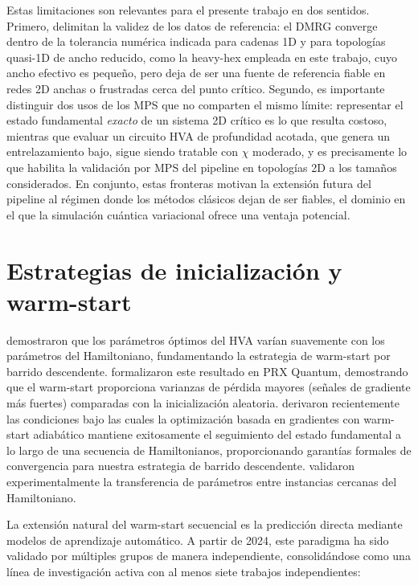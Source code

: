 \documentclass[11pt,a4paper,spanish]{book}
\begin{document}
Estas limitaciones son relevantes para el presente trabajo en dos sentidos. Primero, delimitan la validez de los datos de referencia: el DMRG converge dentro de la tolerancia numérica indicada para cadenas 1D y para topologías quasi-1D de ancho reducido, como la heavy-hex empleada en este trabajo, cuyo ancho efectivo es pequeño, pero deja de ser una fuente de referencia fiable en redes 2D anchas o frustradas cerca del punto crítico. Segundo, es importante distinguir dos usos de los MPS que no comparten el mismo límite: representar el estado fundamental \emph{exacto} de un sistema 2D crítico es lo que resulta costoso, mientras que evaluar un circuito HVA de profundidad acotada, que genera un entrelazamiento bajo, sigue siendo tratable con $\chi$ moderado, y es precisamente lo que habilita la validación por MPS del pipeline en topologías 2D a los tamaños considerados. En conjunto, estas fronteras motivan la extensión futura del pipeline al régimen donde los métodos clásicos dejan de ser fiables, el dominio en el que la simulación cuántica variacional ofrece una ventaja potencial.


\section{Estrategias de inicialización y warm-start}

\citet{mele2022} demostraron que los parámetros óptimos del HVA varían suavemente con los parámetros del Hamiltoniano, fundamentando la estrategia de warm-start por barrido descendente. \citet{puig2025} formalizaron este resultado en PRX Quantum, demostrando que el warm-start proporciona varianzas de pérdida mayores (señales de gradiente más fuertes) comparadas con la inicialización aleatoria. \citet{schiffer2026} derivaron recientemente las condiciones bajo las cuales la optimización basada en gradientes con warm-start adiabático mantiene exitosamente el seguimiento del estado fundamental a lo largo de una secuencia de Hamiltonianos, proporcionando garantías formales de convergencia para nuestra estrategia de barrido descendente. \citet{skogh2023} validaron experimentalmente la transferencia de parámetros entre instancias cercanas del Hamiltoniano.

La extensión natural del warm-start secuencial es la predicción directa mediante modelos de aprendizaje automático. A partir de 2024, este paradigma ha sido validado por múltiples grupos de manera independiente, consolidándose como una línea de investigación activa con al menos siete trabajos independientes:
\end{document}
